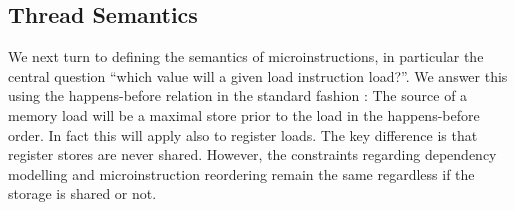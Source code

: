 \subsection{Thread Semantics}
\label{sec:ooo:semantics}
%
We next turn to defining the semantics of microinstructions, in particular the central question ``which value will a given load instruction load?''.
We answer this using the happens-before relation in the standard fashion \cite{Lamport-happens-before}: The source of a memory load will be a maximal store prior to the load in the happens-before order. In fact this will apply also to register loads. The key difference is that register stores are never shared. However, the constraints regarding dependency modelling and microinstruction reordering remain the same regardless if the storage is shared or not.


